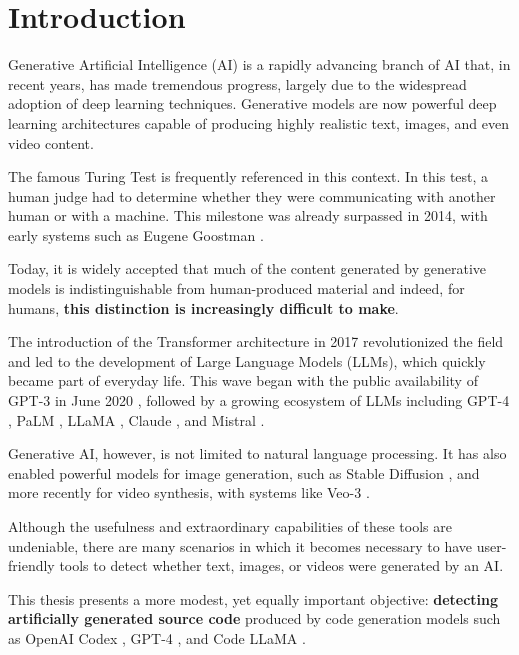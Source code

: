 \clearpage
\chapter{Introduction}


Generative Artificial Intelligence (AI) is a rapidly advancing 
branch of AI that, in recent years, has made 
tremendous progress, largely due to the widespread adoption of 
deep learning techniques. Generative models 
are now powerful deep learning architectures capable of producing 
highly realistic text, images, and even video content.


The famous Turing Test is frequently referenced in this context. 
In this test, a human judge had to determine whether they were 
communicating with another human or with a machine. This milestone 
was already surpassed in 2014, with early systems such as Eugene Goostman 
\cite{warwick2016turing}.


Today, it is widely accepted that much of the content generated by 
generative models is indistinguishable from human-produced material
and indeed, for humans, \textbf{this distinction is increasingly difficult 
to make}.


The introduction of the Transformer architecture in 2017 
\cite{vaswani2017attention} revolutionized the field 
and led to the development of Large Language Models (LLMs), 
which quickly became part of everyday life. This wave began 
with the public availability of GPT-3 \cite{brown2020language} in June 2020 
\cite{brown2020language}, followed by a growing ecosystem of 
LLMs including GPT-4 \cite{openai2023gpt4}, PaLM 
\cite{chowdhery2022palm}, LLaMA \cite{touvron2023llama}, 
Claude \cite{anthropic2023claude}, and Mistral \cite{jiang2023mistral}.

Generative AI, however, is not limited to natural language 
processing. It has also enabled powerful models for image 
generation, such as Stable Diffusion \cite{rombach2022high}, 
and more recently for video 
synthesis, with systems like Veo-3 \cite{google2024veo}.


Although the usefulness and extraordinary capabilities of these 
tools are undeniable, there are many scenarios in which it becomes 
necessary to have user-friendly tools to detect whether text, images, 
or videos were generated by an AI.

This thesis presents a more modest, yet equally important objective: 
\textbf{detecting artificially generated source code} produced by code generation 
models such as OpenAI Codex \cite{chen2021codex}, GPT-4 \cite{openai2023gpt4}, 
and Code LLaMA \cite{roziere2023code}.


